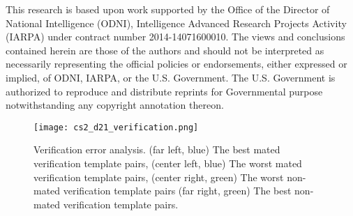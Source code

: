\documentclass[10pt,twocolumn,letterpaper]{article}
\theoremstyle{definition}		\newtheorem{defn}[thm]{Definition}
\newcommand{\figwidth}{6.85in}
\newcommand{\ARXIV}{}
\begin{document}
\smallskip 
{}
This research is based upon work supported by the Office of the Director of National Intelligence (ODNI), Intelligence Advanced Research Projects Activity (IARPA) under contract number 2014-14071600010. The views and conclusions contained herein are those of the authors and should not be interpreted as necessarily representing the official policies or endorsements, either expressed or implied, of ODNI, IARPA, or the U.S. Government.  The U.S. Government is authorized to reproduce and distribute reprints for Governmental purpose notwithstanding any copyright annotation thereon.

\ifdefined\ARXIV
\begin{figure*}[t]
\begin{centering}
\texttt{[image: cs2\_d21\_verification.png]} 
\caption{Verification error analysis.  (far left, blue) The best mated verification template pairs, (center left, blue) The worst mated verification template pairs, (center right, green) The worst non-mated verification template pairs (far right, green) The best non-mated verification template pairs.  
}
\label{f:verification_errors}
\end{centering}
\end{figure*}

 \fi



 
{\small


}
\end{document}
